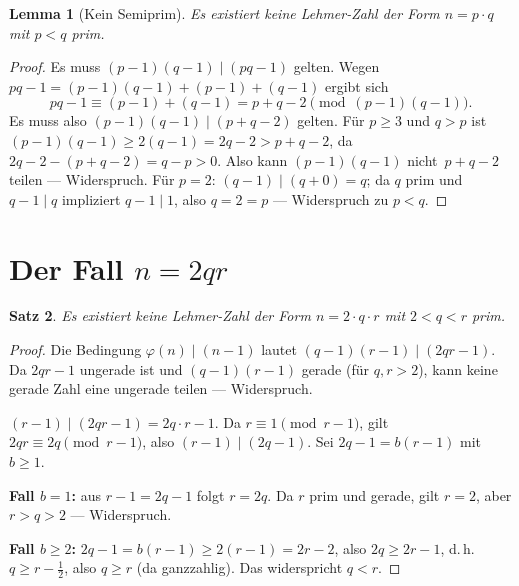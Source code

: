 \documentclass[12pt,a4paper]{amsart}
\newtheorem{theorem}{Satz}[section]
\newtheorem{lemma}[theorem]{Lemma}
\theoremstyle{definition}
\newcommand{\euler}{\varphi}
\begin{document}
\begin{lemma}[Kein Semiprim]
\label{lem:semiprim}
Es existiert keine Lehmer-Zahl der Form $n = p \cdot q$ mit $p < q$ prim.
\end{lemma}

\begin{proof}
Es muss $(p-1)(q-1) \mid (pq - 1)$ gelten.
Wegen $pq - 1 = (p-1)(q-1) + (p-1) + (q-1)$ ergibt sich
\[
  pq - 1 \equiv (p-1) + (q-1) = p + q - 2 \pmod{(p-1)(q-1)}.
\]
Es muss also $(p-1)(q-1) \mid (p + q - 2)$ gelten.
Für $p \ge 3$ und $q > p$ ist $(p-1)(q-1) \ge 2(q-1) = 2q - 2 > p + q - 2$,
da $2q - 2 - (p + q - 2) = q - p > 0$. Also kann $(p-1)(q-1)$ nicht~$p + q - 2$
teilen — Widerspruch. Für $p = 2$: $(q-1) \mid (q + 0) = q$; da $q$ prim und
$q - 1 \mid q$ impliziert $q - 1 \mid 1$, also $q = 2 = p$ — Widerspruch zu $p < q$.
\end{proof}

\section{Der Fall \texorpdfstring{$n = 2qr$}{n = 2qr}}
\label{sec:gerade}

\begin{theorem}
\label{thm:2qr}
Es existiert keine Lehmer-Zahl der Form $n = 2 \cdot q \cdot r$
mit $2 < q < r$ prim.
\end{theorem}

\begin{proof}
Die Bedingung $\euler(n) \mid (n-1)$ lautet $(q-1)(r-1) \mid (2qr - 1)$.
Da $2qr - 1$ ungerade ist und $(q-1)(r-1)$ gerade (für $q, r > 2$), kann keine
gerade Zahl eine ungerade teilen — Widerspruch.

\medskip
$(r-1) \mid (2qr - 1) = 2q \cdot r - 1$.
Da $r \equiv 1 \pmod{r-1}$, gilt $2qr \equiv 2q \pmod{r-1}$, also
$(r-1) \mid (2q - 1)$. Sei $2q - 1 = b(r-1)$ mit $b \ge 1$.

\noindent\textbf{Fall $b = 1$:} aus $r - 1 = 2q - 1$ folgt $r = 2q$. Da $r$ prim und gerade,
gilt $r = 2$, aber $r > q > 2$ — Widerspruch.

\noindent\textbf{Fall $b \ge 2$:} $2q - 1 = b(r-1) \ge 2(r-1) = 2r - 2$,
also $2q \ge 2r - 1$, d.\,h. $q \ge r - \tfrac{1}{2}$, also $q \ge r$
(da ganzzahlig). Das widerspricht $q < r$.
\end{proof}

\end{document}
